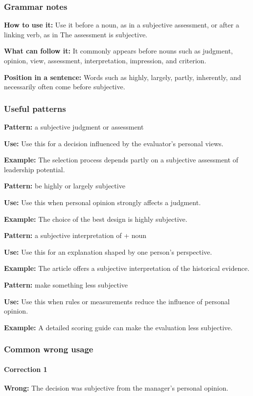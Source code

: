 \documentclass[11pt]{article}
\begin{document}
\subsubsection{Grammar notes}
\textbf{How to use it:} Use it before a noun, as in a subjective assessment, or after a linking verb, as in The assessment is subjective.

\textbf{What can follow it:} It commonly appears before nouns such as judgment, opinion, view, assessment, interpretation, impression, and criterion.

\textbf{Position in a sentence:} Words such as highly, largely, partly, inherently, and necessarily often come before subjective.

\subsubsection{Useful patterns}
\textbf{Pattern:} a subjective judgment or assessment

\textbf{Use:} Use this for a decision influenced by the evaluator's personal views.

\textbf{Example:} The selection process depends partly on a subjective assessment of leadership potential.

\textbf{Pattern:} be highly or largely subjective

\textbf{Use:} Use this when personal opinion strongly affects a judgment.

\textbf{Example:} The choice of the best design is highly subjective.

\textbf{Pattern:} a subjective interpretation of + noun

\textbf{Use:} Use this for an explanation shaped by one person's perspective.

\textbf{Example:} The article offers a subjective interpretation of the historical evidence.

\textbf{Pattern:} make something less subjective

\textbf{Use:} Use this when rules or measurements reduce the influence of personal opinion.

\textbf{Example:} A detailed scoring guide can make the evaluation less subjective.

\subsubsection{Common wrong usage}
\paragraph{Correction 1}
\textbf{Wrong:} The decision was subjective from the manager's personal opinion.
\end{document}
